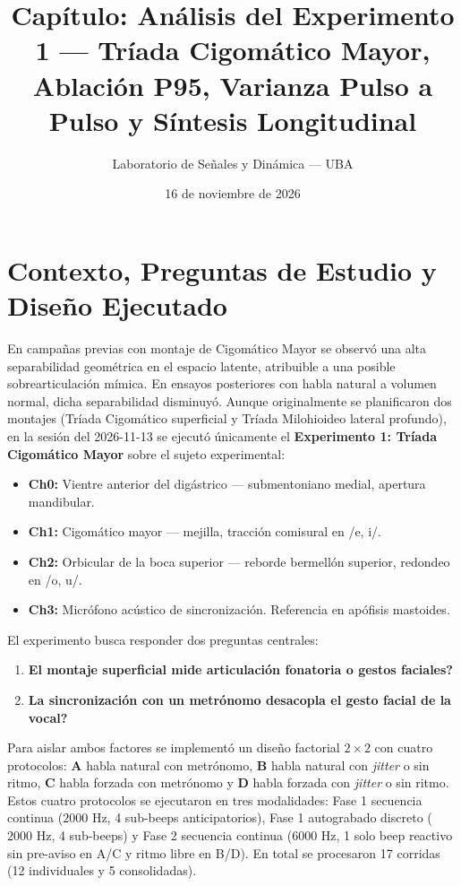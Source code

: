 \documentclass[11pt,a4paper]{article}
\title{Cap\'itulo: An\'alisis del Experimento 1 --- Tr\'iada Cigom\'atico Mayor, Ablaci\'on P95, Varianza Pulso a Pulso y S\'intesis Longitudinal}
\author{Laboratorio de Se\~nales y Din\'amica --- UBA}
\date{16 de noviembre de 2026}
\begin{document}
\maketitle

\section{Contexto, Preguntas de Estudio y Dise\~no Ejecutado}

En campa\~nas previas con montaje de Cigom\'atico Mayor se observ\'o una alta separabilidad geom\'etrica en el espacio latente, atribuible a una posible sobrearticulaci\'on m\'imica. En ensayos posteriores con habla natural a volumen normal, dicha separabilidad disminuy\'o. Aunque originalmente se planificaron dos montajes (Tr\'iada Cigom\'atico superficial y Tr\'iada Milohioideo lateral profundo), en la sesi\'on del 2026-11-13 se ejecut\'o \'unicamente el \textbf{Experimento 1: Tr\'iada Cigom\'atico Mayor} sobre el sujeto experimental:
\begin{itemize}
    \item \textbf{Ch0:} Vientre anterior del dig\'astrico --- submentoniano medial, apertura mandibular.
    \item \textbf{Ch1:} Cigom\'atico mayor --- mejilla, tracci\'on comisural en /e, i/.
    \item \textbf{Ch2:} Orbicular de la boca superior --- reborde bermell\'on superior, redondeo en /o, u/.
    \item \textbf{Ch3:} Micr\'ofono ac\'ustico de sincronizaci\'on. Referencia en ap\'ofisis mastoides.
\end{itemize}

El experimento busca responder dos preguntas centrales:
\begin{enumerate}
    \item \textbf{\textquestiondown El montaje superficial mide articulaci\'on fonatoria o gestos faciales?}
    \item \textbf{\textquestiondown La sincronizaci\'on con un metr\'onomo desacopla el gesto facial de la vocal?}
\end{enumerate}

Para aislar ambos factores se implement\'o un dise\~no factorial $2 \times 2$ con cuatro protocolos: \textbf{A} habla natural con metr\'onomo, \textbf{B} habla natural con \textit{jitter} o sin ritmo, \textbf{C} habla forzada con metr\'onomo y \textbf{D} habla forzada con \textit{jitter} o sin ritmo. Estos cuatro protocolos se ejecutaron en tres modalidades: Fase 1 secuencia continua ($2000\text{ Hz}$, 4 sub-beeps anticipatorios), Fase 1 autograbado discreto ($2000\text{ Hz}$, 4 sub-beeps) y Fase 2 secuencia continua ($6000\text{ Hz}$, 1 solo beep reactivo sin pre-aviso en A/C y ritmo libre en B/D). En total se procesaron 17 corridas (12 individuales y 5 consolidadas).
\end{document}
